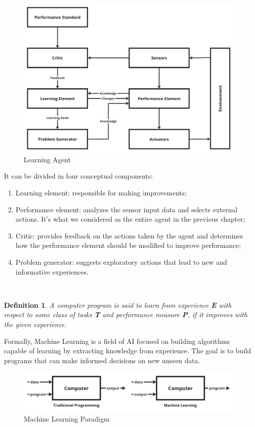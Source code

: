 \documentclass{article}
\newtheorem{definition}{Definition}
\begin{document}
\begin{figure}[h]
    \centering
    \includegraphics[width=0.75\linewidth]{images/Learning Agent.jpg}
    \caption{Learning Agent}
    \label{fig:learning_agent}
\end{figure}

It can be divided in four conceptual components:
\begin{enumerate}
    \item Learning element: responsible for making improvements;
    \item Performance element: analyzes the sensor input data and selects external actions. It's what we considered as the entire agent in the previous chapter;
    \item Critic: provides feedback on the actions taken by the agent and determines how the performance element should be modified to improve performance;
    \item Problem generator: suggests exploratory actions that lead to new and informative experiences. 
\end{enumerate}
\
\begin{definition}
    A computer program is said to learn from experience \textbf{E} with respect to some class of tasks \textbf{T} and performance measure \textbf{P}, if it improves with the given experience.
\end{definition}

Formally, Machine Learning is a field of AI focused on building algorithms capable of learning by extracting knowledge from experience. The goal is to build programs that can make informed decisions on new unseen data.

\begin{figure}[h]
    \centering
    \includegraphics[width=0.75\linewidth]{images/Machine Learning Paradigm.jpg}
    \caption{Machine Learning Paradigm}
    \label{fig:machine_learning_paradigm}
\end{figure}
\end{document}
